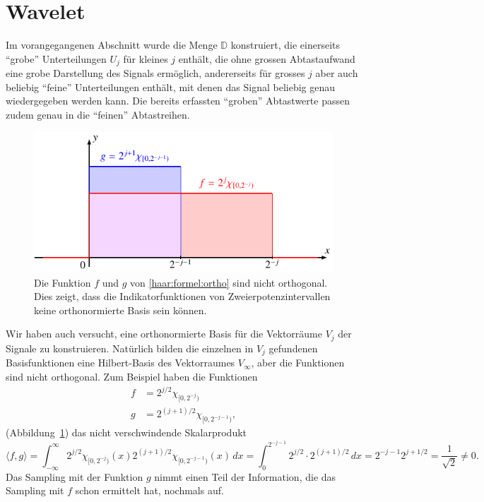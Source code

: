 %
%
%
\section{Wavelet%
\label{section:haar-wavelet}}
Im vorangegangenen Abschnitt wurde die Menge $\mathbb D$ konstruiert, die
einerseits ``grobe'' Unterteilungen $U_j$ für kleines $j$ enthält, die ohne
grossen Abtastaufwand eine grobe Darstellung des Signals ermöglich,
andererseits für grosses $j$ aber auch beliebig ``feine'' Unterteilungen
enthält, mit denen das Signal beliebig genau wiedergegeben werden kann.
Die bereits erfassten ``groben'' Abtastwerte passen zudem genau in die
``feinen'' Abtastreihen.

\begin{figure}
\centering
\includegraphics{chapters/3-haar/images/ortho.pdf}
\caption{Die Funktion $f$ und $g$ von \eqref{haar:formel:ortho} sind
nicht orthogonal.
Dies zeigt, dass die Indikatorfunktionen von Zweierpotenzintervallen
keine orthonormierte Basis sein können.
\label{haar:figure:ortho}}
\end{figure}
Wir haben auch versucht, eine orthonormierte Basis für die Vektorräume
$V_j$ der Signale zu konstruieren.
Natürlich bilden die einzelnen in $V_j$ gefundenen Basisfunktionen eine 
Hilbert-Basis des Vektorraumes $V_\infty$, aber die Funktionen sind
nicht orthogonal.
Zum Beispiel haben die Funktionen 
\begin{equation}
\begin{aligned}
f&=2^{j/2}\chi_{[0,2^{-j})}
\\
g&=2^{(j+1)/2}\chi_{[0,2^{-j-1})},
\end{aligned}
\label{haar:formel:ortho}
\end{equation}
(Abbildung~\ref{haar:figure:ortho})
das nicht verschwindende Skalarprodukt
\[
\langle f,g\rangle 
=
\int_{-\infty}^\infty
2^{j/2}\chi_{[0,2^{-j})}(x)
2^{(j+1)/2}\chi_{[0,2^{-j-1})}(x)\,dx
=
\int_0^{2^{-j-1}} 2^{j/2}\cdot 2^{(j+1)/2}\,dx
=
2^{-j-1}2^{j + 1/2}
=
\frac{1}{\sqrt{2}}\ne 0.
\]
Das Sampling mit der Funktion $g$ nimmt einen Teil der Information,
die das Sampling mit $f$ schon ermittelt hat, nochmals auf.

